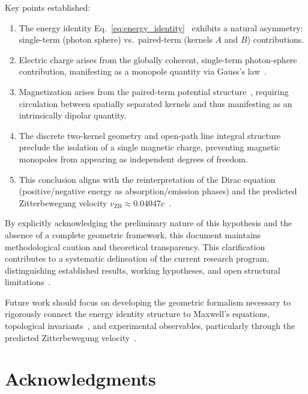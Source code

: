 \documentclass[12pt,letterpaper]{article}
\begin{document}
Key points established:
\begin{enumerate}
\item The energy identity Eq.~\eqref{eq:energy_identity}~\cite{hanamura16759284} exhibits a natural asymmetry: single-term (photon sphere) vs.\ paired-term (kernels $A$ and $B$) contributions.
\item Electric charge arises from the globally coherent, single-term photon-sphere contribution, manifesting as a monopole quantity via Gauss's law~\cite{hanamura18603340}.
\item Magnetization arises from the paired-term potential structure~\cite{hanamura18356895}, requiring circulation between spatially separated kernels and thus manifesting as an intrinsically dipolar quantity.
\item The discrete two-kernel geometry and open-path line integral structure~\cite{hanamura18067760,hanamura18135855,hanamura18203433} preclude the isolation of a single magnetic charge, preventing magnetic monopoles from appearing as independent degrees of freedom.
\item This conclusion aligns with the reinterpretation of the Dirac equation~\cite{hanamura17760132} (positive/negative energy as absorption/emission phases) and the predicted Zitterbewegung velocity $v_{\mathrm{ZB}} \approx 0.04047c$~\cite{hanamura18356895,hanamura17765409}.
\end{enumerate}

By explicitly acknowledging the preliminary nature of this hypothesis and the absence of a complete geometric framework, this document maintains methodological caution and theoretical transparency. This clarification contributes to a systematic delineation of the current research program, distinguishing established results, working hypotheses, and open structural limitations~\cite{hanamura18603340}.

Future work should focus on developing the geometric formalism necessary to rigorously connect the energy identity structure to Maxwell's equations, topological invariants~\cite{Nakahara2003}, and experimental observables, particularly through the predicted Zitterbewegung velocity~\cite{hanamura18356895,hanamura17765409}.

\section*{Acknowledgments}
\end{document}
